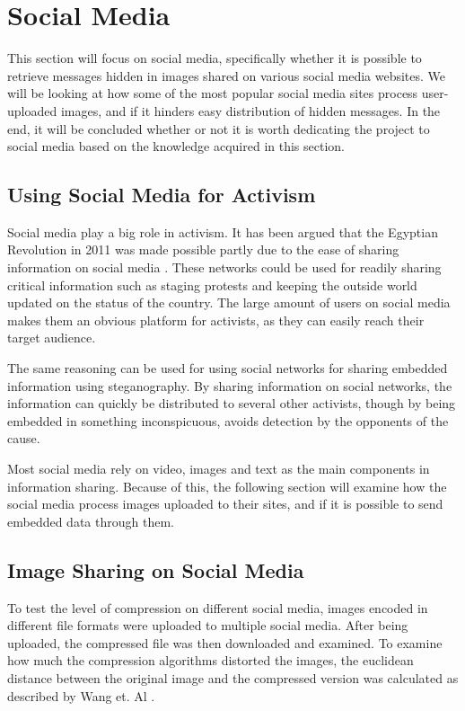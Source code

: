 \clearpage

\section{Social Media}
This section will focus on social media, specifically whether it is possible to retrieve messages hidden in images shared on various social media websites.
We will be looking at how some of the most popular social media sites process user-uploaded images, and if it hinders easy distribution of hidden messages.
In the end, it will be concluded whether or not it is worth dedicating the project to social media based on the knowledge acquired in this section.

\subsection{Using Social Media for Activism}
\label{sec:socialmedia}
Social media play a big role in activism.
It has been argued that the Egyptian Revolution in 2011 was made possible partly due to the ease of sharing information on social media \citep{IJoC1242}.
These networks could be used for readily sharing critical information such as staging protests and keeping the outside world updated on the status of the country.
The large amount of users on social media makes them an obvious platform for activists, as they can easily reach their target audience.

The same reasoning can be used for using social networks for sharing embedded information using steganography.
By sharing information on social networks, the information can quickly be distributed to several other activists, though by being embedded in something inconspicuous, avoids detection by the opponents of the cause.

Most social media rely on video, images and text as the main components in information sharing.
Because of this, the following section will examine how the social media process images uploaded to their sites, and if it is possible to send embedded data through them.

\subsection{Image Sharing on Social Media}
To test the level of compression on different social media, images encoded in different file formats were uploaded to multiple social media.
After being uploaded, the compressed file was then downloaded and examined.
To examine how much the compression algorithms distorted the images, the euclidean distance between the original image and the compressed version was calculated as described by Wang et. Al \citep{Wang2005}.

